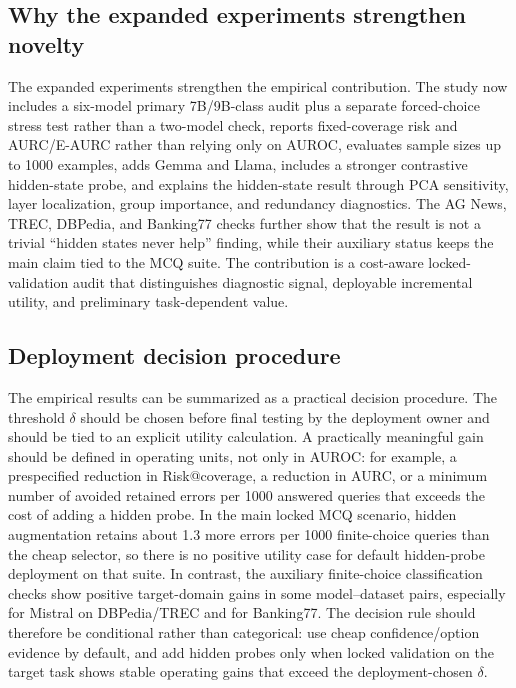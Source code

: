 \documentclass[preprint,12pt,authoryear]{elsarticle}
\begin{document}
\subsection{Why the expanded experiments strengthen novelty}
The expanded experiments strengthen the empirical contribution. The study now includes a six-model primary 7B/9B-class audit plus a separate forced-choice stress test rather than a two-model check, reports fixed-coverage risk and AURC/E-AURC rather than relying only on AUROC, evaluates sample sizes up to 1000 examples, adds Gemma and Llama, includes a stronger contrastive hidden-state probe, and explains the hidden-state result through PCA sensitivity, layer localization, group importance, and redundancy diagnostics. The AG News, TREC, DBPedia, and Banking77 checks further show that the result is not a trivial ``hidden states never help'' finding, while their auxiliary status keeps the main claim tied to the MCQ suite. The contribution is a cost-aware locked-validation audit that distinguishes diagnostic signal, deployable incremental utility, and preliminary task-dependent value.


\subsection{Deployment decision procedure}
\label{sec:decision-rule}
The empirical results can be summarized as a practical decision procedure. The threshold $\delta$ should be chosen before final testing by the deployment owner and should be tied to an explicit utility calculation. A practically meaningful gain should be defined in operating units, not only in AUROC: for example, a prespecified reduction in Risk@coverage, a reduction in AURC, or a minimum number of avoided retained errors per 1000 answered queries that exceeds the cost of adding a hidden probe. In the main locked MCQ scenario, hidden augmentation retains about 1.3 more errors per 1000 finite-choice queries than the cheap selector, so there is no positive utility case for default hidden-probe deployment on that suite. In contrast, the auxiliary finite-choice classification checks show positive target-domain gains in some model--dataset pairs, especially for Mistral on DBPedia/TREC and for Banking77. The decision rule should therefore be conditional rather than categorical: use cheap confidence/option evidence by default, and add hidden probes only when locked validation on the target task shows stable operating gains that exceed the deployment-chosen $\delta$.
\end{document}
